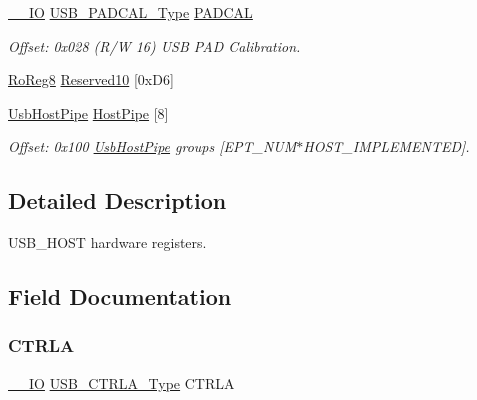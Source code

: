 \begin{DoxyCompactItemize}
\mbox{\hyperlink{core__cm0plus_8h_aec43007d9998a0a0e01faede4133d6be}{\+\_\+\+\_\+\+IO}} \mbox{\hyperlink{union_u_s_b___p_a_d_c_a_l___type}{U\+S\+B\+\_\+\+P\+A\+D\+C\+A\+L\+\_\+\+Type}} \mbox{\hyperlink{struct_usb_host_a446e7b83e50d200ac238425577a31e5a}{P\+A\+D\+C\+AL}}
\begin{DoxyCompactList}\small\item\em Offset\+: 0x028 (R/W 16) U\+SB P\+AD Calibration. \end{DoxyCompactList}\item 
\mbox{\hyperlink{group___s_a_m_d21_e15_a__definitions_ga0d957f1433aaf5d70e4dc2b68288442d}{Ro\+Reg8}} \mbox{\hyperlink{struct_usb_host_ac615b366d825327aa7079ef09c4b51ad}{Reserved10}} \mbox{[}0x\+D6\mbox{]}
\item 
\mbox{\hyperlink{struct_usb_host_pipe}{Usb\+Host\+Pipe}} \mbox{\hyperlink{struct_usb_host_a922ba18f1b5ccc8f9f8e36166fe874e9}{Host\+Pipe}} \mbox{[}8\mbox{]}
\begin{DoxyCompactList}\small\item\em Offset\+: 0x100 \mbox{\hyperlink{struct_usb_host_pipe}{Usb\+Host\+Pipe}} groups \mbox{[}E\+P\+T\+\_\+\+N\+U\+M$\ast$\+H\+O\+S\+T\+\_\+\+I\+M\+P\+L\+E\+M\+E\+N\+T\+ED\mbox{]}. \end{DoxyCompactList}\end{DoxyCompactItemize}


\subsection{Detailed Description}
U\+S\+B\+\_\+\+H\+O\+ST hardware registers. 

\subsection{Field Documentation}
\mbox{\label{struct_usb_host_aa15f86099ea2915cc8667b8ba3980a91}} 
\subsubsection{\texorpdfstring{CTRLA}{CTRLA}}
{\footnotesize\ttfamily \mbox{\hyperlink{core__cm0plus_8h_aec43007d9998a0a0e01faede4133d6be}{\+\_\+\+\_\+\+IO}} \mbox{\hyperlink{union_u_s_b___c_t_r_l_a___type}{U\+S\+B\+\_\+\+C\+T\+R\+L\+A\+\_\+\+Type}} C\+T\+R\+LA}



